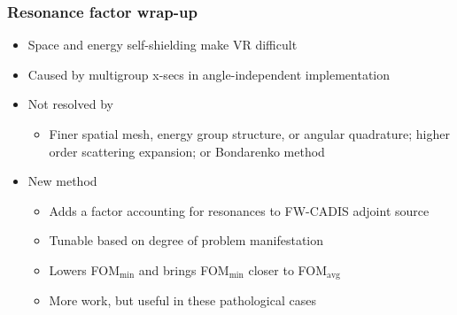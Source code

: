 \documentclass[xcolor=x11names,compress]{beamer}
\renewcommand{\(}{\begin{columns}}
\renewcommand{\)}{\end{columns}}
\newcommand{\<}[1]{\begin{column}{#1}}
\renewcommand{\>}{\end{column}}
\begin{document}
\begin{frame}[fragile]
  \frametitle{Resonance factor wrap-up}
  
  \begin{itemize}
  \item Space and energy self-shielding make VR difficult
  
  \item Caused by multigroup x-secs in angle-independent implementation
  
  \item Not resolved by
   \begin{itemize}
   \item Finer spatial mesh, energy group structure, or angular quadrature; higher order scattering expansion; or Bondarenko method
   \end{itemize}
  \pause 
  \item New method
   \begin{itemize}
  	\item Adds a factor accounting for resonances to FW-CADIS adjoint source
  	\item Tunable based on degree of problem manifestation
	\item \alert{Lowers FOM$_{\min}$ and brings FOM$_{\min}$ closer to FOM$_{\text{avg}}$}
	\item More work, but useful in these pathological cases
   \end{itemize}
  \end{itemize}

\end{frame}


\end{document}
